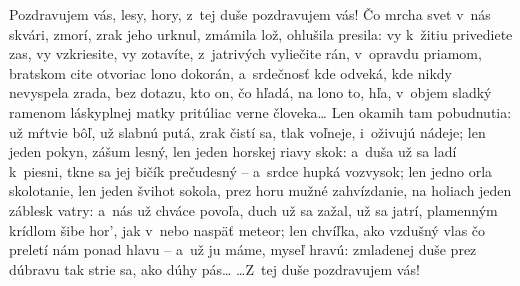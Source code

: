 Pozdravujem vás, lesy, hory,
z~tej duše pozdravujem vás!
Čo mrcha svet v~nás skvári, zmorí,
zrak jeho urknul, zmámila
lož, ohlušila presila:
vy k~žitiu privediete zas,
vy vzkriesite, vy zotavíte,
z~jatrivých vyliečite rán,
v~opravdu priamom, bratskom cite
otvoriac lono dokorán,
a~srdečnosť kde odveká,
kde nikdy nevyspela zrada,
bez dotazu, kto on, čo hľadá,
na lono to, hľa, v~objem sladký
ramenom láskyplnej matky
pritúliac verne človeka\dots
Len okamih tam pobudnutia:
už mŕtvie bôľ, už slabnú putá,
zrak čistí sa, tlak voľneje,
i~oživujú nádeje;
len jeden pokyn, zášum lesný,
len jeden horskej riavy skok:
a~duša už sa ladí k~piesni,
tkne sa jej bičík prečudesný --
a~srdce hupká vozvysok;
len jedno orla skolotanie,
len jeden švihot sokola,
prez horu mužné zahvízdanie,
na holiach jeden záblesk vatry:
a~nás už chváce povoľa,
duch už sa zažal, už sa jatrí,
plamenným krídlom šibe hor’,
jak v~nebo naspäť meteor;
len chvíľka, ako vzdušný vlas
čo preletí nám ponad hlavu --
a~už ju máme, myseľ hravú:
zmladenej duše prez dúbravu
tak strie sa, ako dúhy pás\dots
\dots Z~tej duše pozdravujem vás!
